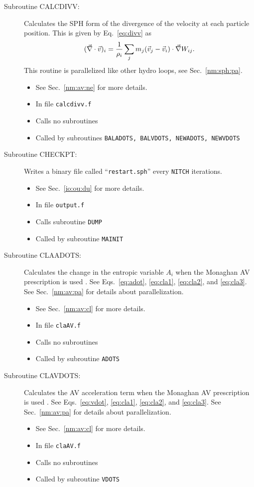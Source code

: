 \begin{description}
\item[Subroutine CALCDIVV:] Calculates the SPH form of the divergence of the 
velocity at each particle position. This is given by Eq.~\ref{eq:divv}
as
\begin{equation}
(\vec{\nabla}\cdot \vec{v})_i={1 \over \rho_i}\sum_j m_j
        (\vec{v}_j-\vec{v}_i)\cdot\vec{\nabla} W_{ij}.
\end{equation}
This routine is parallelized like other hydro loops, see Sec.~\ref{nm:sph:pa}.
\begin{itemize} 
\item See Sec.~\ref{nm:av:ne} for more details.
\item In file {\tt calcdivv.f}
\item Calls no subroutines
\item Called by subroutines {\tt BALADOTS, BALVDOTS, NEWADOTS, NEWVDOTS}
\end{itemize}

\item[Subroutine CHECKPT:] Writes a binary file called ``{\tt restart.sph}''
every {\tt NITCH} iterations. 
\begin{itemize} 
\item See Sec.~\ref{io:ou:du} for more details.
\item In file {\tt output.f}
\item Calls subroutine {\tt DUMP}
\item Called by subroutine {\tt MAINIT}
\end{itemize}

\item[Subroutine CLAADOTS:] Calculates the change in the entropic variable
$A_i$ when the Monaghan AV prescription is used \citep{claAV}.  
See Eqs.~\ref{eq:adot}, \ref{eq:cla1}, \ref{eq:cla2}, and \ref{eq:cla3}.  
See Sec.~\ref{nm:av:pa} for
details about parallelization.
\begin{itemize} 
\item See Sec.~\ref{nm:av:cl} for more details.
\item In file {\tt claAV.f}
\item Calls no subroutines 
\item Called by subroutine {\tt ADOTS}
\end{itemize} 

\item[Subroutine CLAVDOTS:] Calculates the AV acceleration term 
when the Monaghan AV prescription is used \citep{claAV}.  
See Eqs.~\ref{eq:vdot}, \ref{eq:cla1}, \ref{eq:cla2}, and \ref{eq:cla3}.  
See Sec.~\ref{nm:av:pa} for
details about parallelization.
\begin{itemize} 
\item See Sec.~\ref{nm:av:cl} for more details.
\item In file {\tt claAV.f}
\item Calls no subroutines 
\item Called by subroutine {\tt VDOTS}
\end{itemize} 


\end{description}
